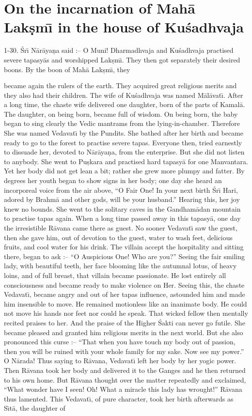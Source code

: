\chapter{On the incarnation of Mah\=a Lak\d{s}m\={\i} in the house of Ku\'sadhvaja}

1-30. \'Sr\={\i} N\=ar\=aya\d{n}a said :-- O Muni! Dharmadhvaja and Ku\'sadhvaja practised severe tapasy\=as and worshipped Lak\d{s}m\={\i}. They then got separately their desired boons. By the boon of Mah\=a Lak\d{s}m\={\i}, they

became again the rulers of the earth. They acquired great religious merits and they also had their children. The wife of Ku\'sadhvaja was named M\=al\=avat\={\i}. After a long time, the chaste wife delivered one daughter, born of the parts of Kamal\=a. The daughter, on being born, became full of wisdom. On being born, the baby began to sing clearly the Vedic mantrams from the lying-in-chamber. Therefore She was named Vedavat\={\i} by the Pundits. She bathed after her birth and became ready to go to the forest to practise severe tapas. Everyone then, tried earnestly to dissuade her, devoted to N\=ar\=aya\d{n}a, from the enterprise. But she did not listen to anybody. She went to Pu\d{s}kara and practised hard tapasy\=a for one Manvantara. Yet her body did not get lean a bit; rather she grew more plumpy and fatter. By degrees her youth began to show signs in her body; one day she heard an incorporeal voice from the air above, ``O Fair One! In your next birth \'Sr\={\i} Hari, adored by Brahm\=a and other gods, will be your husband.'' Hearing this, her joy knew no bounds. She went to the solitary caves in the Gandham\=adan mountain to practise tapas again. When a long time passed away in this tapasy\=a, one day the irresistible R\=avana came there as guest. No sooner Vedavat\={\i} saw the guest, then she gave him, out of devotion to the guest, water to wash feet, delicious fruits, and cool water for his drink. The villain accept the hospitality and sitting there, began to ask :-- ``O Auspicious One! Who are you?'' Seeing the fair smiling lady, with beautiful teeth, her face blooming like the autumnal lotus, of heavy loins, and of full breast, that villain became passionate. He lost entirely all consciousness and became ready to make violence on Her. Seeing this, the chaste Vedavat\={\i}, became angry and out of her tapas influence, astounded him and made him insensible to move. He remained motionless like an inanimate body. He could not move his hands nor feet nor could he speak. That wicked fellow then mentally recited praises to her. And the praise of the Higher \'Sakti can never go futile. She became pleased and granted him religious merits in the next world. But she also pronounced this curse :-- ``That when you have touch my body out of passion, then you will be ruined with your whole family for my sake. Now see my power.'' O N\=arada! Thus saying to R\=avana, Vedavat\={\i} left her body by her yogic power. Then R\=avana took her body and delivered it to the Ganges and he then returned to his own home. But R\=avana thought over the matter repeatedly and exclaimed, ``What wonder have I seen! Oh! What a miracle this lady has wrought!'' R\=avana thus lamented. This Vedavat\={\i}, of pure character, took her birth afterwards as S\={\i}t\=a, the daughter of
